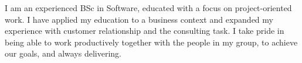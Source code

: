 %
%
%
\par{
I am an experienced BSc in Software, educated with a focus on project-oriented work. I have applied my education to a business context and expanded my experience with customer relationship and the consulting task. I take pride in being able to work productively together with the people in my group, to achieve our goals, and always delivering.
}